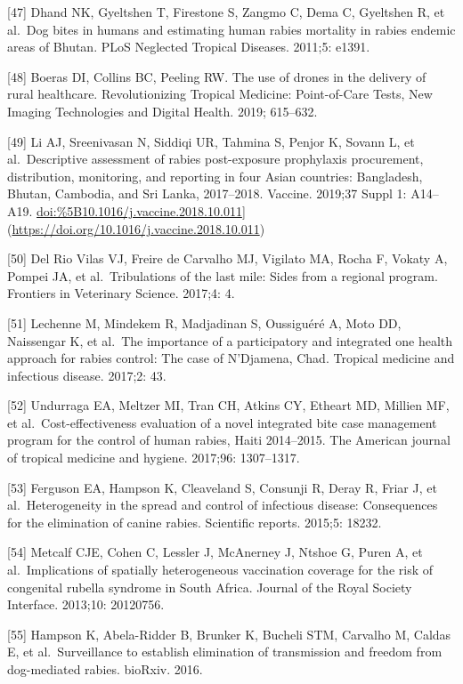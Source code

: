 \documentclass[
  oneside]{book}
\begin{document}
{[}47{]} Dhand NK, Gyeltshen T, Firestone S, Zangmo C, Dema C, Gyeltshen R,
et al.~Dog bites in humans and estimating human rabies mortality in
rabies endemic areas of Bhutan. PLoS Neglected Tropical Diseases.
2011;5: e1391.

{[}48{]} Boeras DI, Collins BC, Peeling RW. The use of drones in the
delivery of rural healthcare. Revolutionizing Tropical Medicine:
Point-of-Care Tests, New Imaging Technologies and Digital Health. 2019;
615--632.

{[}49{]} Li AJ, Sreenivasan N, Siddiqi UR, Tahmina S, Penjor K, Sovann L, et
al.~Descriptive assessment of rabies post-exposure prophylaxis
procurement, distribution, monitoring, and reporting in four Asian
countries: Bangladesh, Bhutan, Cambodia, and Sri Lanka, 2017--2018.
Vaccine. 2019;37 Suppl 1: A14--A19.
\url{doi:\%5B10.1016/j.vaccine.2018.10.011}{]}(\url{https://doi.org/10.1016/j.vaccine.2018.10.011})

{[}50{]} Del Rio Vilas VJ, Freire de Carvalho MJ, Vigilato MA, Rocha F,
Vokaty A, Pompei JA, et al.~Tribulations of the last mile: Sides from a
regional program. Frontiers in Veterinary Science. 2017;4: 4.

{[}51{]} Lechenne M, Mindekem R, Madjadinan S, Oussiguéré A, Moto DD,
Naissengar K, et al.~The importance of a participatory and integrated
one health approach for rabies control: The case of N'Djamena, Chad.
Tropical medicine and infectious disease. 2017;2: 43.

{[}52{]} Undurraga EA, Meltzer MI, Tran CH, Atkins CY, Etheart MD, Millien
MF, et al.~Cost-effectiveness evaluation of a novel integrated bite case
management program for the control of human rabies, Haiti 2014--2015.
The American journal of tropical medicine and hygiene. 2017;96:
1307--1317.

{[}53{]} Ferguson EA, Hampson K, Cleaveland S, Consunji R, Deray R, Friar J,
et al.~Heterogeneity in the spread and control of infectious disease:
Consequences for the elimination of canine rabies. Scientific reports.
2015;5: 18232.

{[}54{]} Metcalf CJE, Cohen C, Lessler J, McAnerney J, Ntshoe G, Puren A, et
al.~Implications of spatially heterogeneous vaccination coverage for the
risk of congenital rubella syndrome in South Africa. Journal of the
Royal Society Interface. 2013;10: 20120756.

{[}55{]} Hampson K, Abela-Ridder B, Brunker K, Bucheli STM, Carvalho M,
Caldas E, et al.~Surveillance to establish elimination of transmission
and freedom from dog-mediated rabies. bioRxiv. 2016.
\end{document}
